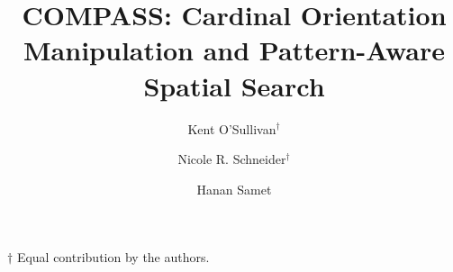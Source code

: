 \documentclass[sigconf]{style/acmart}
\begin{document}


\graphicspath{ {figures/}{auto_commit_fig/}{auto_fig/} }

\newcommand{\latexfile}[1]{}

\newcommand{\pinaforecomment}[4]{\colorbox{#1}{\textcolor{#4}{\parbox{.8\linewidth}{#2: #3}}}}
\newcommand{\osullikomment}[1]{\pinaforecomment{green}{Kent}{#1}{black}}
\newcommand{\nrscomment}[1]{\pinaforecomment{violet}{Nicole}{#1}{white}}

\newcommand\blankpage{%
    \null
    \thispagestyle{empty}%
    \addtocounter{page}{-1}%
    \newpage}

%



\title{COMPASS: Cardinal Orientation Manipulation and Pattern-Aware Spatial Search\\}

\author{Kent O'Sullivan{$^\dagger$}}

\author{Nicole R. Schneider$^\dagger$}

\author{Hanan Samet}



\begin{abstract}
\latexfile{00_Abstract.tex}
\end{abstract}

\maketitle
$\dagger$ Equal contribution by the authors. 
\end{document}
